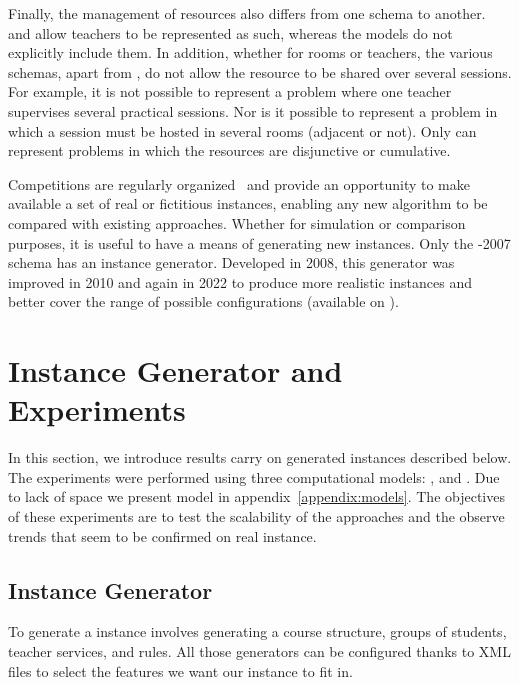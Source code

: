 \documentclass[runningheads]{llncs}
\begin{document}
Finally, the management of resources also differs from one schema to another. \XHSTT{} and \UTP{} allow teachers to be represented as such, whereas the \ITC{} models do not explicitly include them. In addition, whether for rooms or teachers, the various schemas, apart from \UTP{}, do not allow the resource to be shared over several sessions. For example, it is not possible to represent a problem where one teacher supervises several practical sessions. Nor is it possible to represent a problem in which a session must be hosted in several rooms (adjacent or not). Only \UTP{} can represent problems in which the resources are disjunctive or cumulative.



Competitions are regularly organized~\cite{2019_ITC} and provide an opportunity to make available a set of real or fictitious instances, enabling any new algorithm to be compared with existing approaches.
Whether for simulation or comparison purposes, it is useful to have a means of generating new instances.
Only the \ITC{}-2007 schema has an instance generator. Developed in 2008, this generator was improved in 2010 and again in 2022 to produce more realistic instances and better cover the range of possible configurations (available on \cite{2022_dataset}). \section{Instance Generator and Experiments}\label{sec:experiments}


In this section, we introduce results carry on generated instances described below. 
The experiments were performed using three computational models: \CP{}, \ASP{} and \MIP{}.
Due to lack of space we present model in appendix~\ref{appendix:models}.
The objectives of these experiments are to test the scalability of the approaches and the observe trends that seem to be confirmed on real instance.










\subsection{Instance Generator}

To generate a \UTP{} instance involves generating a course structure,
groups of students, 
teacher services, 
and rules.
All those generators can be configured thanks to XML files to select the features we want our instance to fit in.
\end{document}
